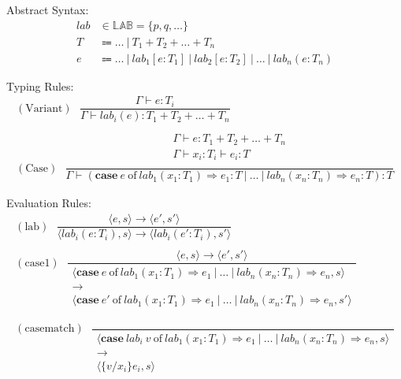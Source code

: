 \documentclass[10pt,\jkfside,a4paper]{article}
\begin{document}
Abstract Syntax:
\[
\begin{split}
lab &\in \mathbb{LAB} = \{p, q, \dots\} \\
T &\Coloneqq \dots \ | \ T_1 + T_2 + \dots + T_n \\
e &\Coloneqq \dots \ | \ lab_1[e:T_1] \ | \ lab_2[e:T_2] \ | \ \dots \ | \
lab_n(e: T_n)
\end{split}
\]

Typing Rules:
\begin{gather*}
(\text{Variant}) \ \ \
\dfrac{
\Gamma \vdash e: T_i
}{
\Gamma \vdash lab_i(e): T_1 + T_2 + \dots + T_n
} \\\\
(\text{Case}) \ \ \
\dfrac{
\begin{matrix}
\Gamma \vdash e: T_1 + T_2 + \dots + T_n \\
\Gamma \vdash x_i: T_i \vdash e_i: T \\
\end{matrix}
}{
\Gamma \vdash (\textbf{case} \ e \ \text{of} \ lab_1(x_1: T_1) \Rightarrow
e_1: T \ | \ \dots
\ | \ lab_n(x_n: T_n) \Rightarrow e_n: T):T
}
\end{gather*}

Evaluation Rules:
\begin{gather*}
(\text{lab}) \ \ \
\dfrac{
\langle e, s \rangle \to \langle e', s' \rangle
}{
\langle
lab_i(e: T_i), s
\rangle
\to
\langle
lab_i(e': T_i), s'
\rangle
}\\\\
(\text{case1}) \ \ \
\dfrac{
\langle e, s \rangle \to \langle e', s' \rangle
}{
\begin{matrix}
\langle \textbf{case} \ e \ \text{of} \ lab_1(x_1: T_1) \Rightarrow e_1 \ | \
\dots
\ | \ lab_n(x_n: T_n) \Rightarrow e_n, s \rangle\\
\to \\
\langle \textbf{case} \ e' \ \text{of} \ lab_1(x_1: T_1) \Rightarrow e_1 \ | \
\dots
\ | \ lab_n(x_n: T_n) \Rightarrow e_n, s' \rangle \\
\end{matrix}
}\\\\
(\text{casematch}) \ \ \
\dfrac{
}{
\begin{matrix}
\langle \textbf{case} \ lab_i \ v \ \text{of} \ lab_1(x_1: T_1) \Rightarrow
e_1 \ | \ \dots\ | \ lab_n(x_n: T_n) \Rightarrow e_n, s \rangle \\
\to \\
\langle \{v/x_i\}e_i, s\rangle
\end{matrix}
}
\end{gather*}
\end{document}
